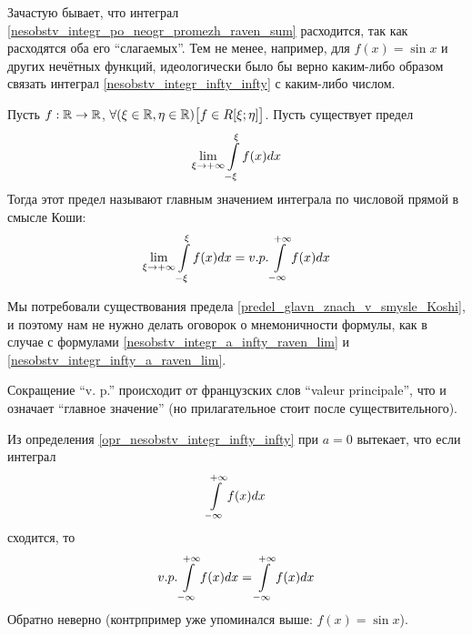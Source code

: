 Зачастую бывает, что интеграл \ref{nesobstv_integr_po_neogr_promezh_raven_sum} расходится, так как расходятся оба его ``слагаемых''.
Тем не менее, например, для $f(x)=\sin x$ и других нечётных функций, идеологически было бы верно каким-либо образом связать интеграл \ref{nesobstv_integr_infty_infty} с каким-либо числом.

\begin{opr}
Пусть $f:\mathbb{R}\to\mathbb{R}$, $\forall(\xi\in\mathbb{R},\eta\in\mathbb{R})\bigl[f\in R[\xi;\eta]\bigr]$.
Пусть существует предел
\begin{equation}\label{predel_glavn_znach_v_smysle_Koshi}
\lim_{\xi\to+\infty} \int\limits_{-\xi}^\xi f(x) dx
\end{equation}
Тогда этот предел называют главным значением интеграла по числовой прямой в смысле Коши:
\begin{equation}
\lim_{\xi\to+\infty} \int\limits_{-\xi}^\xi f(x) dx = v.p.\int\limits^{+\infty}_{-\infty} f(x) dx
\end{equation}
\end{opr}
\begin{zamech}
Мы потребовали существования предела \ref{predel_glavn_znach_v_smysle_Koshi}, и поэтому нам не нужно делать оговорок о мнемоничности формулы, как в случае с формулами \ref{nesobstv_integr_a_infty_raven_lim} и \ref{nesobstv_integr_infty_a_raven_lim}.
\end{zamech}
\begin{zamech}
Сокращение ``v. p.'' происходит от французских слов ``valeur principale'', что и означает ``главное значение'' (но прилагательное стоит после существительного).
\end{zamech}
\begin{zamech}
Из определения \ref{opr_nesobstv_integr_infty_infty} при $a=0$ вытекает, что если интеграл
$$
\int\limits^{+\infty}_{-\infty} f(x) dx
$$
сходится, то 
$$
v.p.\int\limits^{+\infty}_{-\infty} f(x) dx = \int\limits^{+\infty}_{-\infty} f(x) dx
$$
Обратно неверно (контрпример уже упоминался выше: $f(x)=\sin x$).
\end{zamech}

